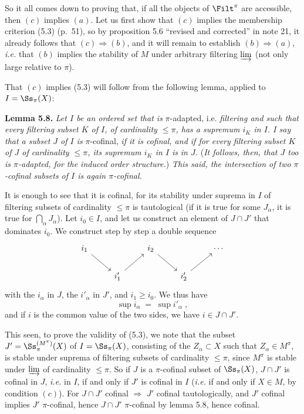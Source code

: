 So it all comes down to proving that, if all the objects of $\Filt^\pi$ are accessible, then $(c)$ implies $(a)$. Let us first show that $(c)$ implies the membership criterion (5.3) (p.~51), so by proposition 5.6 ``revised and corrected'' in note 21, it already follows that $(c) \Longrightarrow (b)$, and it will remain to establish $(b) \Longrightarrow (a)$, \textit{i.e.} that $(b)$ implies the stability of $M$ under arbitrary filtering $\varinjlim$ (not only large relative to $\pi$).

That $(c)$ implies (5.3) will follow from the following lemma, applied to $I = \Ss_\pi(X)$:

\textbf{Lemma 5.8.} \textit{Let $I$ be an ordered set that is} $\pi$-adapted, i.e. \textit{filtering and such that every filtering subset $K$ of $I$, of cardinality $\leq \pi$, has a supremum $i_K$ in $I$. I say that a subset $J$ of $I$ is} $\pi$-cofinal, \textit{if it is cofinal, and if for every filtering subset $K$ of $J$ of cardinality $\leq \pi$, its supremum $i_K$ in $I$ is}
\textit{in $J$.} (\textit{It follows, then, that $J$ too is $\pi$-adapted, for the induced order structure.}) \textit{This said, the intersection of two $\pi$-cofinal subsets of $I$ is again $\pi$-cofinal.}

It is enough to see that it is cofinal, for its stability under suprema in $I$ of filtering subsets of cardinality $\leq \pi$ is tautological (if it is true for some $J_\alpha$, it is true for $\bigcap_\alpha J_\alpha$). Let $i_0 \in I$, and let us construct an element of $J \cap J'$ that dominates $i_0$. We construct step by step a double sequence
\[
\begin{tikzcd}
i_1 \arrow[dr] & & i_2 \arrow[dr] & & \cdots \\
& i'_1 \arrow[ur] & & i'_2 \arrow[ur] &
\end{tikzcd}
\]
with the $i_\alpha$ in $J$, the $i'_\alpha$ in $J'$, and $i_1 \geq i_0$. We thus have
\[
\sup i_\alpha \;=\; \sup i'_\alpha \;,
\]
and if $i$ is the common value of the two sides, we have $i \in J \cap J'$.

This seen, to prove the validity of (5.3), we note that the subset $J' = \Ss_\pi^{(M^\pi)}(X)$ of $I = \Ss_\pi(X)$, consisting of the $Z_\alpha \subset X$ such that $Z_\alpha \in M^\pi$, is stable under suprema of filtering subsets of cardinality $\leq \pi$, since $M^\pi$ is stable
under $\varinjlim$ of cardinality $\leq \pi$. So if $J$ is a $\pi$-cofinal subset of $\Ss_\pi(X)$, $J \cap J'$ is cofinal in $J$, \textit{i.e.} in $I$, if and only if $J'$ is cofinal in $I$ (\textit{i.e.} if and only if $X \in M$, by condition $(c)$). For $J \cap J'$ cofinal $\Longrightarrow$ $J'$ cofinal tautologically, and $J'$ cofinal implies $J'$ $\pi$-cofinal, hence $J \cap J'$ $\pi$-cofinal by lemma 5.8, hence cofinal.

